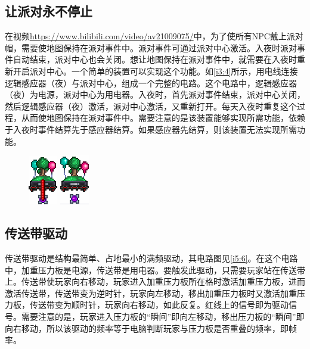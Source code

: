 \subsection{让派对永不停止}

在视频\url{https://www.bilibili.com/video/av21009075/}中，为了使所有NPC戴上派对帽，需要使地图保持在派对事件中。派对事件可通过派对中心激活。入夜时派对事件自动结束，派对中心也会关闭。想让地图保持在派对事件中，就需要在入夜时重新开启派对中心。一个简单的装置可以实现这个功能。如\autoref{i3:4}所示，用电线连接逻辑感应器（夜）与派对中心，组成一个完整的电路。这个电路中，逻辑感应器（夜）为电源，派对中心为用电器。入夜时，首先派对事件结束，派对中心关闭，然后逻辑感应器（夜）激活，派对中心激活，又重新打开。每天入夜时重复这个过程，从而使地图保持在派对事件中。需要注意的是该装置能够实现所需功能，依赖于入夜时事件结算先于感应器结算。如果感应器先结算，则该装置无法实现所需功能。

\begin{figure}[!ht]
\begin{center}
\includegraphics{images/3.png}
\qquad
\includegraphics{images/4.png}
\end{center}
\caption{}
\label{i3:4}
\end{figure}

\subsection{传送带驱动}

传送带驱动是结构最简单、占地最小的满频驱动，其电路图见\autoref{i5:6}。在这个电路中，加重压力板是电源，传送带是用电器。要触发此驱动，只需要玩家站在传送带上。传送带使玩家向右移动，玩家进入加重压力板所在格时激活加重压力板，进而激活传送带，传送带变为逆时针，玩家向左移动，移出加重压力板时又激活加重压力板，传送带变为顺时针，玩家向右移动，如此反复。红线上的信号即为驱动信号。需要注意的是，玩家进入压力板的“瞬间”即向左移动，移出压力板的“瞬间”即向右移动，所以该驱动的频率等于电脑判断玩家与压力板是否重叠的频率，即帧率。


